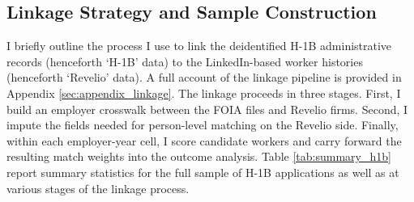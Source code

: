 


\subsection{Linkage Strategy and Sample Construction}
I briefly outline the process I use to link the deidentified H-1B administrative records (henceforth `H-1B' data) to the LinkedIn-based worker histories (henceforth `Revelio' data). A full account of the linkage pipeline is provided in Appendix \ref{sec:appendix_linkage}. The linkage proceeds in three stages. First, I build an employer crosswalk between the FOIA files and Revelio firms. Second, I impute the fields needed for person-level matching on the Revelio side. Finally, within each employer-year cell, I score candidate workers and carry forward the resulting match weights into the outcome analysis. Table \ref{tab:summary_h1b} report summary statistics for the full sample of H-1B applications as well as at various stages of the linkage process.

